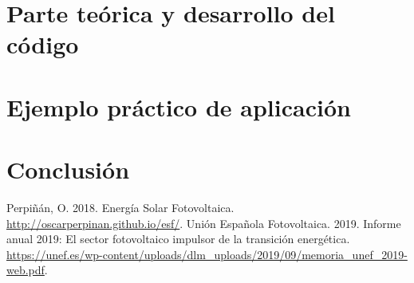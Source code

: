 \documentclass[11pt]{report}
\begin{document}
\chapter{Parte teórica y desarrollo del código}
\label{sec:theory}


\chapter{Ejemplo práctico de aplicación}

\chapter{Conclusión}


\pagebreak

\begin{thebibliography}{99}
 Perpiñán, O. 2018. Energía Solar Fotovoltaica. \url{http://oscarperpinan.github.io/esf/}.
 Unión Española Fotovoltaica. 2019. Informe anual 2019: El sector fotovoltaico impulsor de la transición energética. \url{https://unef.es/wp-content/uploads/dlm_uploads/2019/09/memoria_unef_2019-web.pdf}.  
\end{thebibliography}
\end{document}

